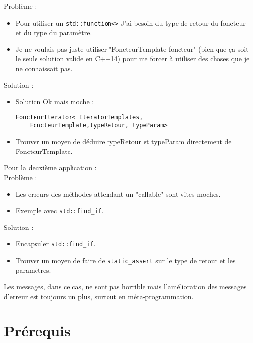 \documentclass{beamer}
\begin{document}
\begin{frame}[containsverbatim]
	Problème : 
	\begin{itemize}
		\item Pour utiliser un \lstinline{std::function<>} J'ai besoin du type de retour du foncteur et du type du paramètre. 
		\item Je ne voulais pas juste utiliser "FoncteurTemplate foncteur" (bien que ça soit le seule solution valide en C++14) pour me forcer à utiliser des choses que je ne connaissait pas.
	\end{itemize}
	Solution :
	\begin{itemize}
		\item Solution Ok mais moche : 
	\begin{lstlisting}
FoncteurIterator< IteratorTemplates,
    FoncteurTemplate,typeRetour, typeParam>
	\end{lstlisting}		
		\item Trouver un moyen de déduire typeRetour et typeParam directement de FoncteurTemplate. 
	\end{itemize}
\end{frame}

\begin{frame}
	Pour la deuxième application :  
\\
		Problème : 
	\begin{itemize}
		\item Les erreurs des méthodes attendant un "callable" sont vites moches.
		\item Exemple avec \lstinline{std::find_if}.
	\end{itemize}
	Solution :
	\begin{itemize}
		\item Encapsuler \lstinline{std::find_if}.
		\item Trouver un moyen de faire de \lstinline{static_assert} sur le type de retour et les paramètres. 
	\end{itemize}
	
	Les messages, dans ce cas, ne sont pas horrible mais l’amélioration des messages d'erreur est toujours un plus, surtout en méta-programmation.
\end{frame}

\section{Prérequis}
\end{document}
